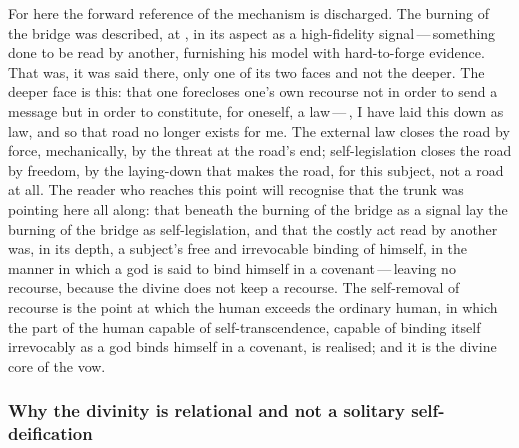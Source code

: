 For here the forward reference of the mechanism is discharged. The burning of the bridge was described, at , in its aspect as a high-fidelity signal\,---\,something done to be read by another, furnishing his model with hard-to-forge evidence. That was, it was said there, only one of its two faces and not the deeper. The deeper face is this: that one forecloses one's own recourse not in order to send a message but in order to constitute, for oneself, a law\,---\,, I have laid this down as law, and so that road no longer exists for me. The external law closes the road by force, mechanically, by the threat at the road's end; self-legislation closes the road by freedom, by the laying-down that makes the road, for this subject, not a road at all. The reader who reaches this point will recognise that the trunk was pointing here all along: that beneath the burning of the bridge as a signal lay the burning of the bridge as self-legislation, and that the costly act read by another was, in its depth, a subject's free and irrevocable binding of himself, in the manner in which a god is said to bind himself in a covenant\,---\,leaving no recourse, because the divine does not keep a recourse. The self-removal of recourse is the point at which the human exceeds the ordinary human, in which the part of the human capable of self-transcendence, capable of binding itself irrevocably as a god binds himself in a covenant, is realised; and it is the divine core of the vow.

\subsubsection{Why the divinity is relational and not a solitary self-deification}
\label{p13:sub:prax-relational-not-solitary}

